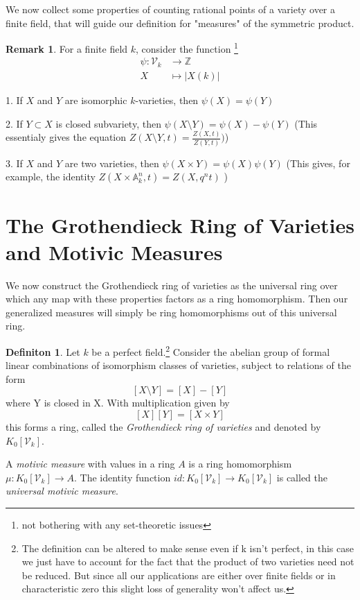 \documentclass[11pt, a4paper, german]{article}
\theoremstyle{plain}
\theoremstyle{definition}
\newtheorem{definition}[theorem]{Definiton}
\newtheorem{remark}[theorem]{Remark}
\newcommand{\gring}[1][k]{K_0[\mathcal{V}_#1]}
\begin{document}
We now collect some properties of counting rational points of a variety over a finite field, that will guide our definition for "measures" 
of the symmetric product.

\begin{remark}
    For a finite field $k$, consider the function \footnote{not bothering with any set-theoretic issues} 
    \begin{align*}
        \psi: \mathcal{V}_k & \to   \mathbb{Z}\\
        X & \mapsto |X(k)|
    \end{align*}

    1. If $X$ and $Y$ are isomorphic $k$-varieties, then $\psi(X) = \psi(Y)$

    2. If $Y \subset X$ is closed subvariety, then $\psi(X \setminus Y) = \psi(X) - \psi(Y)$ 
    (This essentialy gives the equation $Z(X \setminus Y, t) = \frac{Z(X, t)}{Z(Y,t)})$)

    3. If $X$ and $Y$ are two varieties, then $\psi(X \times Y) = \psi(X)\psi(Y)$
    (This gives, for example, the identity $Z(X \times \mathbb{A}^n_k, t) = Z(X, q^nt)$ )
\end{remark}


\section{The Grothendieck Ring of Varieties and Motivic Measures}

We now construct the Grothendieck ring of varieties as the universal ring over which any map with these properties factors as a 
ring homomorphism. Then our generalized measures will simply be ring homomorphisms out of this universal ring.

\begin{definition}
    Let $k$ be a perfect field.\footnote{The definition can be altered to make sense even if k isn't perfect, 
    in this case we just have to account for the fact that the product of two varieties need not be reduced. 
    But since all our applications are either over finite fields or in characteristic zero this slight loss of generality won't affect us.}
    Consider the abelian group of formal linear combinations of isomorphism classes of varieties, subject to relations of the form
    \[
        [X \setminus Y] = [X] - [Y]
    \] where Y is closed in X.
    With multiplication given by
    \[
        [X][Y] = [X \times Y]
    \]
    this forms a ring, called the \emph{Grothendieck ring of varieties} and denoted by $\gring$. 
    
    A \emph{motivic measure} with values in a ring $A$ is a ring homomorphism $\mu: \gring \to A$. The identity function
    $id: \gring \to \gring$ is called the \emph{universal motivic measure}.
\end{definition}
\end{document}
